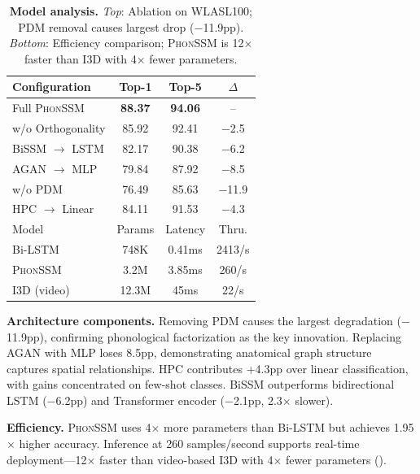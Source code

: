 \documentclass{article}
\theoremstyle{definition}
\theoremstyle{remark}
\newcommand{\phonssm}{\textsc{PhonSSM}}
\begin{document}
\begin{table}[!t]
\caption{\textbf{Model analysis.} \textit{Top}: Ablation on WLASL100; PDM removal causes largest drop ($-$11.9pp). \textit{Bottom}: Efficiency comparison; \phonssm{} is 12$\times$ faster than I3D with 4$\times$ fewer parameters.}
\label{tab:analysis}
\vspace{-2mm}
\begin{center}
\begin{small}
\begin{tabular*}{\columnwidth}{@{\extracolsep{\fill}}lccc@{}}
\toprule
Configuration & Top-1 & Top-5 & $\Delta$ \\
\midrule
Full \phonssm{} & \textbf{88.37} & \textbf{94.06} & -- \\
w/o Orthogonality & 85.92 & 92.41 & $-$2.5 \\
BiSSM $\rightarrow$ LSTM & 82.17 & 90.38 & $-$6.2 \\
AGAN $\rightarrow$ MLP & 79.84 & 87.92 & $-$8.5 \\
w/o PDM & 76.49 & 85.63 & $-$11.9 \\
HPC $\rightarrow$ Linear & 84.11 & 91.53 & $-$4.3 \\
\midrule
Model & Params & Latency & Thru. \\
\midrule
Bi-LSTM & 748K & 0.41ms & 2413/s \\
\phonssm{} & 3.2M & 3.85ms & 260/s \\
I3D (video) & 12.3M & 45ms & 22/s \\
\bottomrule
\end{tabular*}
\end{small}
\end{center}
\vspace{-4mm}
\end{table}

\textbf{Architecture components.} Removing PDM causes the largest degradation ($-$11.9pp), confirming phonological factorization as the key innovation. Replacing AGAN with MLP loses 8.5pp, demonstrating anatomical graph structure captures spatial relationships. HPC contributes +4.3pp over linear classification, with gains concentrated on few-shot classes. BiSSM outperforms bidirectional LSTM ($-$6.2pp) and Transformer encoder ($-$2.1pp, 2.3$\times$ slower).

\textbf{Efficiency.} \phonssm{} uses 4$\times$ more parameters than Bi-LSTM but achieves 1.95$\times$ higher accuracy. Inference at 260 samples/second supports real-time deployment---12$\times$ faster than video-based I3D with 4$\times$ fewer parameters ().
\end{document}
